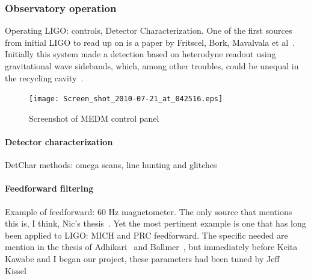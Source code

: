             \subsubsection{Observatory operation}
            \label{observatory_operation}

                Operating LIGO: controls, Detector Characterization. One of the first sources from initial LIGO to read up on is a paper by Fritscel, Bork, Mavalvala et al~\cite{ReadoutGWA}. Initially this system made a detection based on heterodyne readout using gravitational wave sidebands, which, among other troubles, could be unequal in the recycling cavity~\cite{MeadorsHanford2005}.

	\begin{figure}
	\begin{center}
	\texttt{[image: Screen\_shot\_2010-07-21\_at\_042516.eps]}
	\caption{Screenshot of MEDM control panel}
	\label{ScreenshotMEDM}
	\end{center}
	\end{figure}


                \paragraph{Detector characterization}
                \label{detchar}
            
                    DetChar methods: omega scans, line hunting and glitches

                \paragraph{Feedforward filtering}
                \label{feedforward_filters}

                    Example of feedforward: 60 Hz magnetometer. The only source that mentions this is, I think, Nic's thesis~\cite{SmithThesis}. Yet the most pertinent example is one that has long been applied to LIGO: MICH and PRC feedforward. The specific needed are mention in the thesis of Adhikari~\cite{AdhikariThesis} and Ballmer~\cite{BallmerThesis}, but immediately before Keita Kawabe and I began our project, these parameters had been tuned by Jeff Kissel~\cite{KissellPRCMICH}


